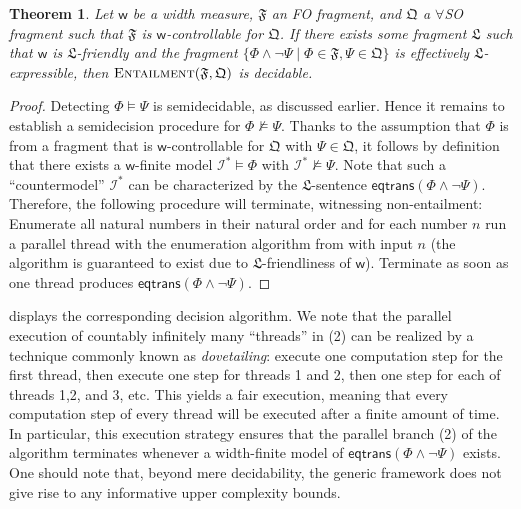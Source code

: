 \documentclass[10pt,a4paper]{amsart}
\theoremstyle{definition}
\numberwithin{equation}{section}
\theoremstyle{plain}
\newtheorem{theorem}[theorem]{Theorem}
\theoremstyle{definition}
\theoremstyle{myexample}
\theoremstyle{plain}
\theoremstyle{definition}
\newcommand{\instance}{\mathcal{I}}
\newcommand{\fcn}[1]{\mathsf{#1}}
\begin{document}
\begin{theorem}\label{thm:decidablequerying}
Let $\fcn{w}$ be a width measure,
$\mathfrak{F}$ an FO fragment, and 
$\mathfrak{Q}$ a $\forall$SO fragment 
such that $\mathfrak{F}$ is $\fcn{w}$-controllable for $\mathfrak{Q}$.
If there exists some fragment $\mathfrak{L}$ such that $\fcn{w}$ is $\mathfrak{L}$-friendly
and the fragment $\{\Phi \wedge \neg \Psi \mid \Phi \in \mathfrak{F}, \Psi \in \mathfrak{Q}\}$ is effectively 
$\mathfrak{L}$-expressible, then $\textsc{Entailment}(\mathfrak{F},\mathfrak{Q})$ is decidable.
\end{theorem}





\begin{proof}
Detecting $\Phi \models \Psi$ is semidecidable, as discussed earlier.
Hence it remains to establish a semidecision procedure for $\Phi \not\models \Psi$. 
Thanks to the assumption that $\Phi$ is from a fragment that is $\fcn{w}$-controllable for $\mathfrak{Q}$ with $\Psi \in \mathfrak{Q}$, it follows by definition that there exists a $\fcn{w}$-finite model $\instance^* \models \Phi$ with $\instance^* \not\models \Psi$.
Note that such a ``countermodel'' $\instance^*$ can be characterized by the $\mathfrak{L}$-sentence $\fcn{eqtrans}(\Phi \wedge \neg\Psi)$.  %
 Therefore, the following procedure will terminate, witnessing non-entailment: Enumerate all natural numbers in their natural order and for each number $n$ run a parallel thread with the enumeration algorithm from  with input $n$ (the algorithm is guaranteed to exist due to $\mathfrak{L}$-friendliness of $\fcn{w}$). Terminate as soon as one thread produces $\fcn{eqtrans}(\Phi \wedge \neg\Psi)$.\qedhere
\end{proof}


 displays the corresponding decision algorithm. We note that the parallel execution of countably infinitely many ``threads'' in (2) can be realized by a technique commonly known as \emph{dovetailing}: execute one computation step for the first thread, then execute one step for threads 1 and 2, then one step for each of threads 1,2, and 3, etc. This yields a fair execution, meaning that every computation step of every thread will be executed after a finite amount of time. In particular, this execution strategy ensures that the parallel branch (2) of the algorithm terminates whenever a width-finite model of $\fcn{eqtrans}(\Phi \wedge \neg\Psi)$ exists. One should note that, beyond mere decidability, the generic framework does not give rise to any informative upper complexity bounds.
\end{document}
